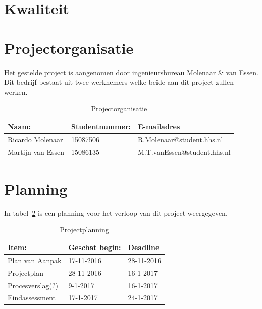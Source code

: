 \documentclass[numbers=endperiod]{scrartcl}
\begin{document}
	\section{Kwaliteit}
	\newpage

	\section{Projectorganisatie}
	Het gestelde project is aangenomen door ingenieursbureau Molenaar \& van Essen. Dit bedrijf bestaat uit
	twee werknemers welke beide aan dit project zullen werken. 
	\begin{table}[h]
	\caption{Projectorganisatie}\label{table:Projectorganisatie}
	
		\centering
		\begin{tabular}{ p{} | p{} | p{} }
			Naam: 				& Studentnummer:& E-mailadres \\ \hline
			Ricardo Molenaar 	& 15087506	 	& R.Molenaar@student.hhs.nl \\
			Martijn van Essen 	& 15086135		& M.T.vanEssen@student.hhs.nl \\
		\end{tabular}
	
	\end{table}
	\newpage

	\section{Planning}
	In tabel~\ref{table:Planning} is een planning voor het verloop van dit project weergegeven.
	\begin{table}[h]
	\caption{Projectplanning}\label{table:Planning}
	\centering
	\begin{tabular}{| p{} | p{} | p{} |}
			\hline \rowcolor{hhs_theme_heading_2}
			Item: 				& Geschat begin:& Deadline \\ \hline
			Plan van Aanpak 	& 17-11-2016 	& 28-11-2016 \\ \hline
			Projectplan		 	& 28-11-2016	& 16-1-2017 \\ \hline
			Procesverslag(?)	& 9-1-2017		& 16-1-2017 \\ \hline
			Eindassessment		& 17-1-2017		& 24-1-2017 \\ \hline
		\end{tabular}
	\end{table}
	\newpage


	
	
\end{document}
